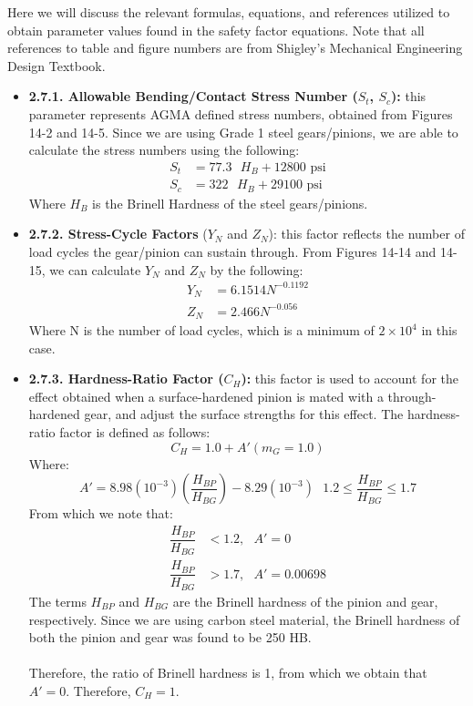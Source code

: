 \documentclass[letterpaper,12pt]{article}
\begin{document}
\noindent Here we will discuss the relevant formulas, equations, and references utilized to obtain parameter values found in the safety factor equations. Note that all references to table and figure numbers are from Shigley's Mechanical Engineering Design Textbook.
\begin{itemize}[leftmargin=3mm]
    \item \textbf{2.7.1. Allowable Bending/Contact Stress Number ($S_t$, $S_c$):} this parameter represents AGMA defined stress numbers, obtained from Figures 14-2 and 14-5. Since we are using Grade 1 steel gears/pinions, we are able to calculate the stress numbers using the following:
    \begin{align*}
        S_t &= 77.3\text{ }H_B + 12800 \text{ psi} \\
        S_c &= 322\text{ }H_B + 29100 \text{ psi}
    \end{align*}
    Where $H_B$ is the Brinell Hardness of the steel gears/pinions.
    
    \item \textbf{2.7.2. Stress-Cycle Factors} ($Y_N$ and $Z_N$): this factor reflects the number of load cycles the gear/pinion can sustain through. From Figures 14-14 and 14-15, we can calculate $Y_N$ and $Z_N$ by the following:
    \begin{align*}
        Y_N &= 6.1514 N^{-0.1192} \\
        Z_N &= 2.466 N^{-0.056}
    \end{align*}
    Where N is the number of load cycles, which is a minimum of $2 \times 10^4$ in this case.
    
    \item \textbf{2.7.3. Hardness-Ratio Factor ($C_H$):} this factor is used to account for the effect obtained when a surface-hardened pinion is mated with a through-hardened gear, and adjust the surface strengths for this effect. The hardness-ratio factor is defined as follows:
    \begin{equation}
        C_H = 1.0 + A'(m_G = 1.0)
    \end{equation}
    Where:
    \begin{equation*}
        A' = 8.98(10^{-3})\left(\dfrac{H_{BP}}{H_{BG}}\right) - 8.29(10^{-3})\text{ }1.2 \leq \frac{H_{BP}}{H_{BG}} \leq 1.7
    \end{equation*}
    From which we note that:
    \begin{align*}
        \dfrac{H_{BP}}{H_{BG}} &< 1.2, \text{ $A' = 0$} \\
        \dfrac{H_{BP}}{H_{BG}} &> 1.7, \text{ $A' = 0.00698$}
    \end{align*}
    The terms $H_{BP}$ and $H_{BG}$ are the Brinell hardness of the pinion and gear, respectively. Since we are using carbon steel material, the Brinell hardness of both the pinion and gear was found to be 250 HB. \\\\
    Therefore, the ratio of Brinell hardness is 1, from which we obtain that $A' = 0$. Therefore, $C_H = 1$.
    

\end{itemize}
\end{document}
